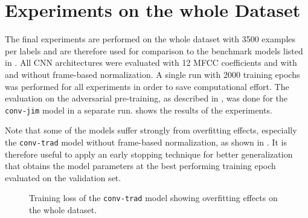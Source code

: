 
\section{Experiments on the whole Dataset}\label{sec:exp_final}
The final experiments are performed on the whole dataset with 3500 examples per labels and are therefore used for comparison to the benchmark models listed in .
All CNN architectures were evaluated with 12 MFCC coefficients and with and without frame-based normalization.
A single run with 2000 training epochs was performed for all experiments in order to save computational effort.
The evaluation on the adversarial pre-training, as described in , was done for the \texttt{conv-jim} model in a separate run.
 shows the results of the experiments.

Note that some of the models suffer strongly from overfitting effects, especially the \texttt{conv-trad} model without frame-based normalization, as shown in .
It is therefore useful to apply an early stopping technique for better generalization that obtains the model parameters at the best performing training epoch evaluated on the validation set.
\begin{figure}[!ht]
  \centering
  \quad
  \caption{Training loss of the \texttt{conv-trad} model showing overfitting effects on the whole dataset.}
  \label{fig:exp_final_loss_conv-trad}
\end{figure}
